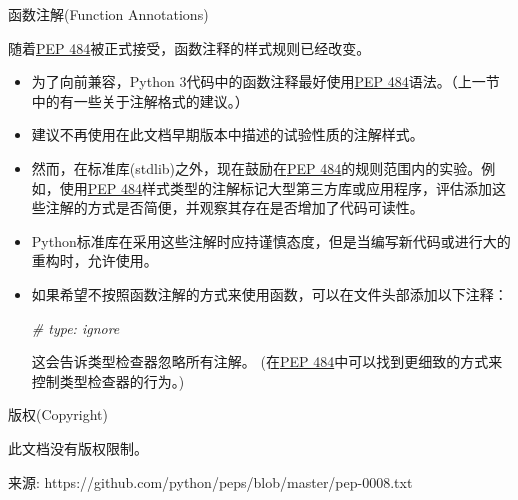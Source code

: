 \documentclass[ignorenonframetext,9pt]{beamer}
\newenvironment{Shaded}{}{}
\newcommand{\CommentTok}[1]{\textcolor[rgb]{0.38,0.63,0.69}{\textit{#1}}}
\begin{document}
\begin{frame}[fragile]

\begin{block}{函数注解(Function Annotations)}

随着\href{https://www.python.org/dev/peps/pep-0484}{PEP
484}被正式接受，函数注释的样式规则已经改变。

\begin{itemize}
\item
  为了向前兼容，Python
  3代码中的函数注释最好使用\href{https://www.python.org/dev/peps/pep-0484}{PEP
  484}语法。（上一节中的有一些关于注解格式的建议。）
\item
  建议不再使用在此文档早期版本中描述的试验性质的注解样式。
\item
  然而，在标准库(stdlib)之外，现在鼓励在\href{https://www.python.org/dev/peps/pep-0484}{PEP
  484}的规则范围内的实验。例如，使用\href{https://www.python.org/dev/peps/pep-0484}{PEP
  484}样式类型的注解标记大型第三方库或应用程序，评估添加这些注解的方式是否简便，并观察其存在是否增加了代码可读性。
\item
  Python标准库在采用这些注解时应持谨慎态度，但是当编写新代码或进行大的重构时，允许使用。
\item
  如果希望不按照函数注解的方式来使用函数，可以在文件头部添加以下注释：

\begin{Shaded}
\begin{Highlighting}[]
\CommentTok{# type: ignore}
\end{Highlighting}
\end{Shaded}

  这会告诉类型检查器忽略所有注解。
  (在\href{https://www.python.org/dev/peps/pep-0484}{PEP
  484}中可以找到更细致的方式来控制类型检查器的行为。)
\end{itemize}
\end{block}
\end{frame}
\begin{frame}[fragile]
\begin{block}{}

\end{block}

\end{frame}

\begin{frame}{版权(Copyright)}
\protect\hypertarget{ux7248ux6743copyright}{}

此文档没有版权限制。

来源: https://github.com/python/peps/blob/master/pep-0008.txt

\end{frame}
\end{document}
